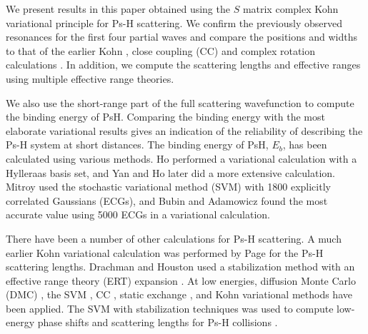 \documentclass[preprint,showpacs,showkeys,preprintnumbers,amsmath,amssymb,longbibliography,pra,aps]{revtex4-1}
\begin{document}
We present results in this paper obtained using the $S$ matrix complex Kohn 
variational principle for Ps-H scattering. We confirm the previously observed 
resonances for the first four partial waves and compare the positions and 
widths to that of the earlier Kohn \cite{VanReeth2003,VanReeth2004}, close 
coupling (CC) \cite{Walters2004} and complex rotation calculations
\cite{Yan1999,Yan1998a,Ho1998,Ho2000}. In addition, we compute the scattering
lengths and effective ranges using multiple effective range theories.

We also use the short-range part of the full scattering wavefunction to 
compute the binding energy of PsH. Comparing the binding energy with the most 
elaborate variational results gives an indication of the reliability of 
describing the Ps-H system at short distances. The binding energy of PsH,
$E_b$, has been calculated using various methods. Ho \cite{Ho1986} performed a 
variational calculation with a Hylleraas basis set, and Yan and Ho
\cite{Yan1999} later did a more extensive calculation. Mitroy \cite{Mitroy2006}
used the stochastic variational method (SVM) with 1800 explicitly correlated 
Gaussians (ECGs), and Bubin and Adamowicz \cite{Bubin2006} found the most 
accurate value using 5000 ECGs in a variational calculation.

There have been a number of other calculations for Ps-H scattering. A much 
earlier Kohn variational calculation was performed by Page \cite{Page1976} 
for the Ps-H scattering lengths. Drachman and Houston used a stabilization 
method with an effective range theory (ERT) expansion
\cite{Drachman1975,Drachman1976}. At low energies, diffusion Monte Carlo (DMC)
\cite{Chiesa2002}, the SVM \cite{Ivanov2001,Ivanov2002}, CC
\cite{Sinha1997,Campbell1998,Adhikari1999,Sinha2000,Blackwood2002,Blackwood2002b,Walters2004},
static exchange \cite{Hara1975,Ray1997}, and Kohn variational
\cite{Page1976,VanReeth2003,VanReeth2004} methods have been applied. The SVM
with stabilization 
techniques was used to compute low-energy phase shifts and 
scattering lengths for Ps-H collisions \cite{Ivanov2001,Ivanov2002}.
\end{document}
